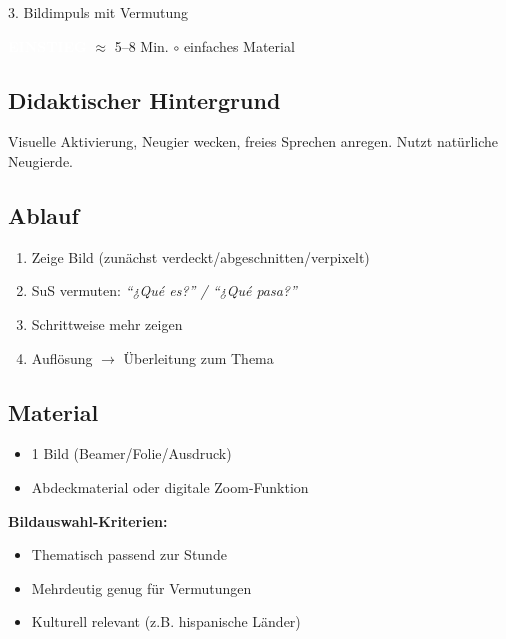 \documentclass[11pt, a4paper]{article}
\newcommand{\tagEinstieg}{\colorbox{einstieg}{\textcolor{white}{\footnotesize\textbf{EINSTIEG}}}}
\newcommand{\zeit}[1]{\textcolor{grau}{\footnotesize $\approx$ #1 Min.}}
\newcommand{\matEinfach}{\textcolor{warnung}{$\circ$ einfaches Material}}
\begin{document}
\begin{methode}{3. Bildimpuls mit Vermutung}

\tagEinstieg{} \zeit{5--8} \hfill \matEinfach

\subsection*{Didaktischer Hintergrund}
Visuelle Aktivierung, Neugier wecken, freies Sprechen anregen. Nutzt natürliche Neugierde.

\subsection*{Ablauf}
\begin{enumerate}[leftmargin=*]
    \item Zeige Bild (zunächst verdeckt/abgeschnitten/verpixelt)
    \item SuS vermuten: \textit{``¿Qué es?'' / ``¿Qué pasa?''}
    \item Schrittweise mehr zeigen
    \item Auflösung $\rightarrow$ Überleitung zum Thema
\end{enumerate}

\subsection*{Material}
\begin{materialbox}
\begin{itemize}[label=$\square$, leftmargin=*]
    \item 1 Bild (Beamer/Folie/Ausdruck)
    \item Abdeckmaterial oder digitale Zoom-Funktion
\end{itemize}

\textbf{Bildauswahl-Kriterien:}
\begin{itemize}[leftmargin=*]
    \item Thematisch passend zur Stunde
    \item Mehrdeutig genug für Vermutungen
    \item Kulturell relevant (z.B. hispanische Länder)
\end{itemize}
\end{materialbox}

\end{methode}

\newpage

\end{document}
